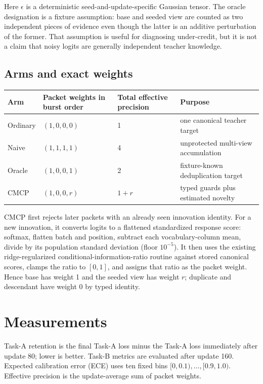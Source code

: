 \documentclass[10pt]{article}
\begin{document}
Here $\epsilon$ is a deterministic seed-and-update-specific Gaussian tensor.
The oracle designation is a fixture assumption: base and seeded view are
counted as two independent pieces of evidence even though the latter is an
additive perturbation of the former. That assumption is useful for diagnosing
under-credit, but it is not a claim that noisy logits are generally
independent teacher knowledge.

\subsection*{Arms and exact weights}

\begin{center}
\begin{tabularx}{\linewidth}{lYYY}
\toprule
Arm & Packet weights in burst order & Total effective precision & Purpose \\
\midrule
Ordinary & $(1,0,0,0)$ & 1 & one canonical teacher target \\
Naive & $(1,1,1,1)$ & 4 & unprotected multi-view accumulation \\
Oracle & $(1,0,0,1)$ & 2 & fixture-known deduplication target \\
CMCP & $(1,0,0,r)$ & $1+r$ & typed guards plus estimated novelty \\
\bottomrule
\end{tabularx}
\end{center}

CMCP first rejects later packets with an already seen innovation identity.
For a new innovation, it converts logits to a flattened standardized response
score: softmax, flatten batch and position, subtract each vocabulary-column
mean, divide by its population standard deviation (floor $10^{-5}$). It then
uses the existing ridge-regularized conditional-information-ratio routine
against stored canonical scores, clamps the ratio to $[0,1]$, and assigns that
ratio as the packet weight. Hence base has weight 1 and the seeded view has
weight $r$; duplicate and descendant have weight 0 by typed identity.

\section*{Measurements}

Task-A retention is the final Task-A loss minus the Task-A loss immediately
after update 80; lower is better. Task-B metrics are evaluated after update
160. Expected calibration error (ECE) uses ten fixed bins $[0,0.1),\ldots,
[0.9,1.0)$. Effective precision is the update-average sum of packet weights.
\end{document}
